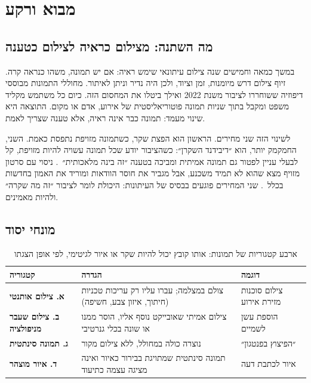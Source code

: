 \chapter{מבוא ורקע}\label{ch:intro}

\section{מה השתנה: מצילום כראיה לצילום כטענה}
במשך כמאה וחמישים שנה צילום עיתונאי שימש ראיה: אם יש תמונה, משהו כנראה קרה. זיוף צילום דרש מיומנות, זמן וציוד, ולכן היה נדיר וניתן לאיתור. מחוללי התמונות מבוססי דיפוזיה ששוחררו לציבור משנת \num{2022} ואילך ביטלו את המחסום הזה. כיום כל משתמש מקליד משפט ומקבל בתוך שניות תמונה פוטוריאליסטית של אירוע, אדם או מקום. התוצאה היא שינוי מעמד: תמונה כבר אינה ראיה, אלא טענה שצריך לאמת.

לשינוי הזה שני מחירים. הראשון הוא הפצת שקר, כשתמונה מזויפת נתפסת כאמת. השני, החמקמק יותר, הוא ״דיבידנד השקרן״: כשהציבור יודע שכל תמונה עשויה להיות מזויפת, קל לבעלי עניין לפטור גם תמונה אמיתית ומביכה בטענה ״זה בינה מלאכותית״~\cite{chesney2019}. ניסוי עם סרטון מזויף מצא שהוא לא תמיד משכנע, אבל מגביר את חוסר הוודאות ומוריד את האמון בחדשות בכלל~\cite{vaccari2020}. שני המחירים פוגעים בבסיס של העיתונות: היכולת לומר לציבור ״זה מה שקרה״ ולהיות מאמינים.

\section{מונחי יסוד}
\begin{table}[!htb]\centering
\caption{ארבע קטגוריות של תמונות: אותו קובץ יכול להיות שקר או איור לגיטימי, לפי אופן הצגתו}\label{tab:taxonomy}
\begin{tabularx}{\linewidth}{@{}l Y l@{}}
\toprule
\textbf{קטגוריה} & \textbf{הגדרה} & \textbf{דוגמה} \\
\midrule
\textbf{א. צילום אותנטי} & צולם במצלמה; עברו עליו רק עריכות טכניות (חיתוך, איזון צבע, חשיפה) & צילום סוכנות מזירת אירוע \\
\textbf{ב. צילום שעבר מניפולציה} & צילום אמיתי שאובייקט נוסף אליו, הוסר ממנו או שונה בכלי גנרטיבי & הוספת עשן לשמיים \\
\textbf{ג. תמונה סינתטית} & נוצרה כולה במחולל, ללא צילום מקור & ״הפיצוץ בפנטגון״ \\
\textbf{ד. איור מוצהר} & תמונה סינתטית שמתויגת בבירור כאיור ואינה מציגה עצמה כתיעוד & איור לכתבת דעה \\
\bottomrule
\end{tabularx}
\end{table}

